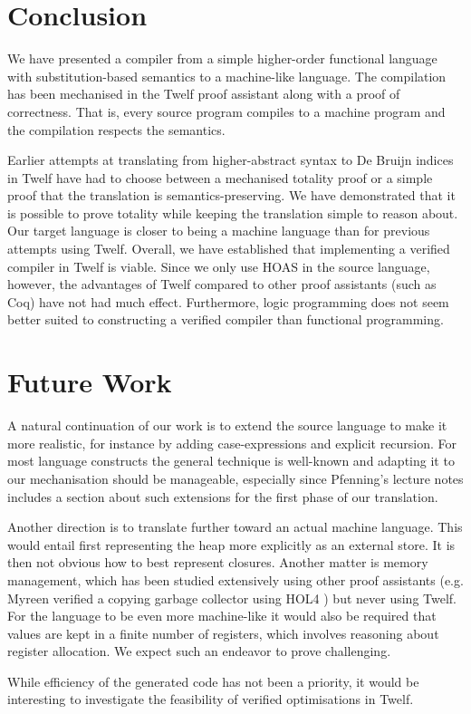\section{Conclusion}

We have presented a compiler from a simple higher-order functional language with substitution-based semantics to a machine-like language.
The compilation has been mechanised in the Twelf proof assistant along with a proof of correctness.
That is, every source program compiles to a machine program and the compilation respects the semantics.

Earlier attempts at translating from higher-abstract syntax to De Bruijn indices in Twelf have had to choose between a mechanised totality proof or a simple proof that the translation is semantics-preserving.
We have demonstrated that it is possible to prove totality while keeping the translation simple to reason about.
Our target language is closer to being a machine language than for previous attempts using Twelf.
Overall, we have established that implementing a verified compiler in Twelf is viable.
Since we only use HOAS in the source language, however, the advantages of Twelf compared to other proof assistants (such as Coq) have not had much effect.
Furthermore, logic programming does not seem better suited to constructing a verified compiler than functional programming.



\section{Future Work}

A natural continuation of our work is to extend the source language to make it more realistic, for instance by adding case-expressions and explicit recursion.
For most language constructs the general technique is well-known and adapting it to our mechanisation should be manageable, especially since Pfenning's lecture notes \cite{Pfenning01} includes a section about such extensions for the first phase of our translation.

Another direction is to translate further toward an actual machine language.
This would entail first representing the heap more explicitly as an external store.
It is then not obvious how to best represent closures. %
Another matter is memory management, which has been studied extensively using other proof assistants (e.g. Myreen verified a copying garbage collector using HOL4 \cite{Myreen10}) but never using Twelf.
For the language to be even more machine-like it would also be required that values are kept in a finite number of registers, which involves reasoning about register allocation.
We expect such an endeavor to prove challenging.

While efficiency of the generated code has not been a priority, it would be interesting to investigate the feasibility of verified optimisations in Twelf.
